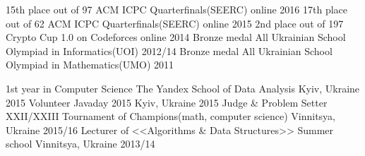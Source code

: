 






\begin{cvhonors}
  \cvhonor
    {15th place out of 97}
    {ACM ICPC Quarterfinals(SEERC)}
    {online}
    {2016}
  \cvhonor
    {17th place out of 62}
    {ACM ICPC Quarterfinals(SEERC)}
    {online}
    {2015}
  \cvhonor
    {2nd place out of 197}
    {Crypto Cup 1.0 on Codeforces}
    {online}
    {2014}
  \cvhonor
    {Bronze medal}
    {All Ukrainian School Olympiad in Informatics(UOI)}
    {}
    {2012/14}
  \cvhonor
    {Bronze medal}
    {All Ukrainian School Olympiad in Mathematics(UMO)}
    {}
    {2011}
\end{cvhonors}

\begin{cvhonors}
  \cvhonor
    {1st year in Computer Science}
    {The Yandex School of Data Analysis}
    {Kyiv, Ukraine}
    {2015}
  \cvhonor
    {Volunteer}
    {Javaday 2015}
    {Kyiv, Ukraine}
    {2015}
  \cvhonor
    {Judge \& Problem Setter}
    {XXII/XXIII Tournament of Champions(math, computer science)}
    {Vinnitsya, Ukraine}
    {2015/16}
  \cvhonor
    {Lecturer of <<Algorithms \& Data Structures>>}
    {Summer school}
    {Vinnitsya, Ukraine}
    {2013/14}
\end{cvhonors}
